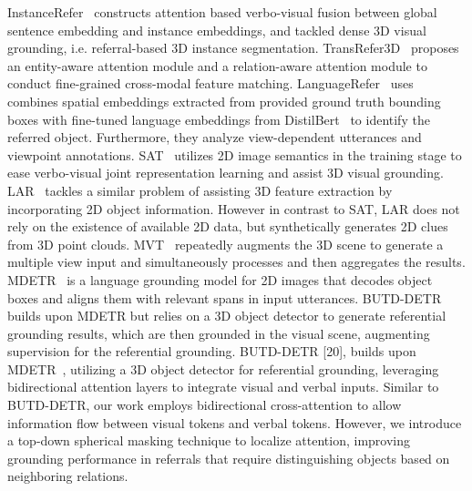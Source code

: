 \documentclass[10pt,twocolumn,letterpaper]{article}
\begin{document}
InstanceRefer~\cite{yuan2021instancerefer} constructs attention based verbo-visual fusion between global sentence embedding and instance embeddings, and tackled dense 3D visual grounding, i.e. referral-based 3D instance segmentation. TransRefer3D~\cite{He_2021} proposes an entity-aware attention module and a relation-aware attention module to conduct fine-grained cross-modal feature matching. 
LanguageRefer~\cite{roh2022languagerefer} uses combines spatial embeddings extracted from provided ground truth bounding boxes with fine-tuned language embeddings from DistilBert~\cite{sanh2019distilbert} to identify the referred object. Furthermore, they analyze view-dependent utterances and viewpoint annotations.
SAT~\cite{yang2021sat} utilizes 2D image semantics in the training stage to ease verbo-visual joint representation learning and assist 3D visual grounding. LAR~\cite{bakr2022look} tackles a similar problem of assisting 3D feature extraction by incorporating 2D object information. However in contrast to SAT, LAR does not rely on the existence of available 2D data, but synthetically generates 2D clues from 3D point clouds. MVT~\cite{huang2022multiview} repeatedly augments the 3D scene to generate a multiple view input and simultaneously processes and then aggregates the results. MDETR~\cite{kamath2021mdetr} is a language grounding model for 2D images that decodes object boxes and aligns them with relevant spans in input utterances. BUTD-DETR~\cite{jain2022bottom} builds upon MDETR but relies on a 3D object detector to generate referential grounding results, which are then grounded in the visual scene, augmenting supervision for the referential grounding.
BUTD-DETR [20], builds upon  MDETR~\cite{kamath2021mdetr}, utilizing a 3D object detector for referential grounding, leveraging bidirectional attention layers to integrate visual and verbal inputs. Similar to BUTD-DETR, our work employs bidirectional cross-attention to allow information flow between visual tokens and verbal tokens. However, we introduce a top-down spherical masking technique to localize attention, improving grounding performance in referrals that require distinguishing objects based on neighboring relations.
\end{document}
